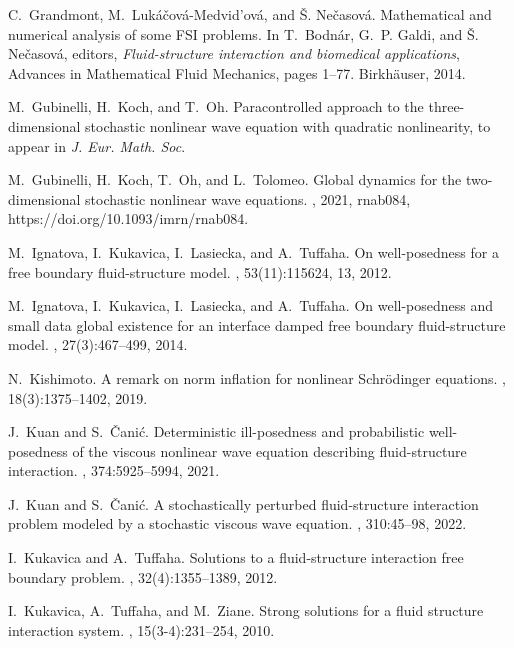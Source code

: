 \documentclass[letterpaper, 11pt,  reqno]{amsart}
\newcommand{\1}{\hspace{0.5mm}\text{I}\hspace{0.2mm}}
\numberwithin{equation}{section}
\numberwithin{theorem}{section}
\begin{document}
\begin{thebibliography}{10}
C.~Grandmont, M.~Luk\'{a}\v{c}ov\'{a}-Medvid'ov\'{a}, and \v{S}.
  Ne\v{c}asov\'{a}.
\newblock Mathematical and numerical analysis of some {F}{S}{I} problems.
\newblock In T.~Bodn\'{a}r, G.~P. Galdi, and \v{S}. Ne\v{c}asov\'{a}, editors,
  {\em Fluid-structure interaction and biomedical applications}, Advances in
  Mathematical Fluid Mechanics, pages 1--77. Birkh\"{a}user, 2014.

M.~Gubinelli, H.~Koch, and T.~Oh.
\newblock Paracontrolled approach to the three-dimensional stochastic nonlinear
  wave equation with quadratic nonlinearity,
\newblock to appear in {\em J. Eur. Math. Soc}.

M.~Gubinelli, H.~Koch, T.~Oh, and L.~Tolomeo.
\newblock Global dynamics for the two-dimensional stochastic nonlinear wave
  equations.
, 2021, rnab084, https://doi.org/10.1093/imrn/rnab084.

M.~Ignatova, I.~Kukavica, I.~Lasiecka, and A.~Tuffaha.
\newblock On well-posedness for a free boundary fluid-structure model.
, 53(11):115624, 13, 2012.

M.~Ignatova, I.~Kukavica, I.~Lasiecka, and A.~Tuffaha.
\newblock On well-posedness and small data global existence for an interface
  damped free boundary fluid-structure model.
, 27(3):467--499, 2014.

N.~Kishimoto.
\newblock A remark on norm inflation for nonlinear {S}chr\"{o}dinger equations.
, 18(3):1375--1402, 2019.

J.~Kuan and S.~\v{C}ani\'{c}.
\newblock Deterministic ill-posedness and probabilistic well-posedness of the
  viscous nonlinear wave equation describing fluid-structure interaction.
, 374:5925--5994, 2021.

J.~Kuan and S.~\v{C}ani\'{c}.
\newblock A stochastically perturbed fluid-structure interaction problem modeled by a stochastic viscous wave equation.
, 310:45--98, 2022.

I.~Kukavica and A.~Tuffaha.
\newblock Solutions to a fluid-structure interaction free boundary problem.
, 32(4):1355--1389, 2012.

I.~Kukavica, A.~Tuffaha, and M.~Ziane.
\newblock Strong solutions for a fluid structure interaction system.
, 15(3-4):231--254, 2010.


\end{thebibliography}
\end{document}
